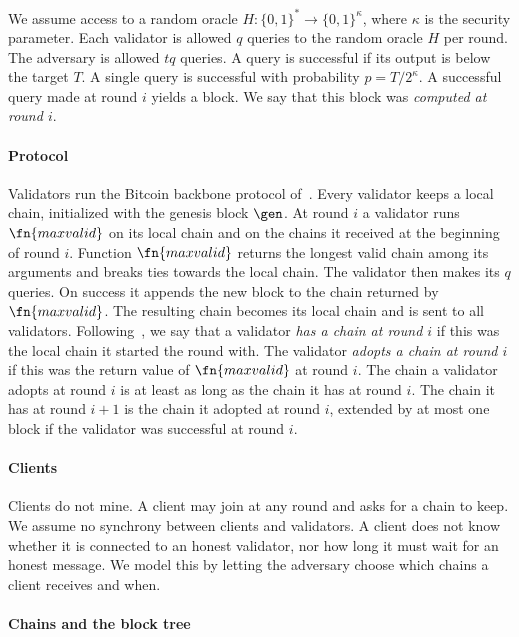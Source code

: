 We assume access to a random oracle $H \colon \{0,1\}^* \to \{0,1\}^\kappa$,
where $\kappa$ is the security parameter.  Each validator is allowed $q$ queries
to the random oracle $H$ per round. The adversary is allowed $tq$ queries. A
query is successful if its output is below the target $T$. A single query is
successful with probability $p=T/2^\kappa$. A successful query made at round
$i$ yields a block. We say that this block was \emph{computed at round $i$}.

\paragraph{Protocol}

Validators run the Bitcoin backbone protocol of~\cite{gkl24}. Every validator
keeps a local chain, initialized with the genesis block $\gen$. At round $i$ a
validator runs $\fn{maxvalid}$ on its local chain and on the chains it received
at the beginning of round $i$. Function $\fn{maxvalid}$ returns the longest
valid chain among its arguments and breaks ties towards the local chain. The
validator then makes its $q$ queries. On success it appends the new block to the
chain returned by $\fn{maxvalid}$. The resulting chain becomes its local chain
and is sent to all validators. Following~\cite{gkl24}, we say that a validator
\emph{has a chain at round $i$} if this was the local chain it started the round
with. The validator \emph{adopts a chain at round $i$} if this was the return
value of $\fn{maxvalid}$ at round $i$. The chain a validator adopts at round
$i$ is at least as long as the chain it has at round $i$. The chain it has at
round $i+1$ is the chain it adopted at round $i$, extended by at most one block
if the validator was successful at round $i$.

\paragraph{Clients}

Clients do not mine. A client may join at any round and asks for a chain to keep. We assume no synchrony between clients and validators. A client does not
know whether it is connected to an honest validator, nor how long it must wait
for an honest message. We model this by letting the adversary choose which
chains a client receives and when.

\paragraph{Chains and the block tree}

